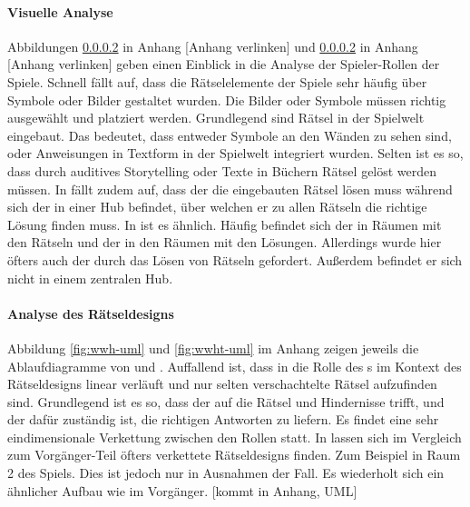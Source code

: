 \paragraph{Visuelle Analyse}
Abbildungen \ref{} in Anhang [Anhang verlinken] und \ref{} in Anhang [Anhang verlinken] geben einen Einblick in die Analyse der Spieler-Rollen der Spiele. Schnell fällt auf, dass die Rätselelemente der Spiele sehr häufig über Symbole oder Bilder gestaltet wurden. Die Bilder oder Symbole müssen richtig ausgewählt und platziert werden.  Grundlegend sind Rätsel in der Spielwelt eingebaut. Das bedeutet, dass entweder Symbole an den Wänden zu sehen sind, oder Anweisungen in Textform in der Spielwelt integriert wurden. Selten ist es so, dass durch auditives Storytelling oder Texte in Büchern Rätsel gelöst werden müssen. In  fällt zudem auf, dass der  die eingebauten Rätsel lösen muss während sich der  in einer Hub befindet, über welchen er zu allen Rätseln die richtige Lösung finden muss. In  ist es ähnlich. Häufig befindet sich der  in Räumen mit den Rätseln und der  in den Räumen mit den Lösungen. Allerdings wurde hier öfters auch der  durch das Lösen von Rätseln gefordert. Außerdem befindet er sich nicht in einem zentralen Hub.

\paragraph{Analyse des Rätseldesigns}
Abbildung \ref{fig:wwh-uml} und \ref{fig:wwht-uml} im Anhang zeigen jeweils die Ablaufdiagramme von  und . Auffallend ist, dass in  die Rolle des s im Kontext des Rätseldesigns linear verläuft und nur selten verschachtelte Rätsel aufzufinden sind. Grundlegend ist es so, dass der  auf die Rätsel und Hindernisse trifft, und der  dafür zuständig ist, die richtigen Antworten zu liefern. Es findet eine sehr eindimensionale Verkettung zwischen den Rollen statt.
In  lassen sich im Vergleich zum Vorgänger-Teil öfters verkettete Rätseldesigns finden. Zum Beispiel in Raum 2 des Spiels. Dies ist jedoch nur in Ausnahmen der Fall. Es wiederholt sich ein ähnlicher Aufbau wie im Vorgänger.
[kommt in Anhang, UML]

